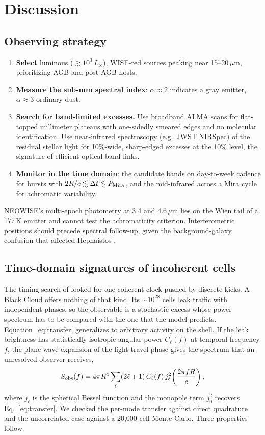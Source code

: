 \documentclass[final,5p]{elsarticle}
\newcommand{\Lsun}{L_\odot}
\begin{document}
\section{Discussion}\label{sec:discussion}

\subsection{Observing strategy}
\begin{enumerate}
\item \textbf{Select} luminous ($\gtrsim10^3\,\Lsun$), WISE-red sources peaking near 15--20\,$\mu$m, prioritizing AGB and post-AGB hosts.
\item \textbf{Measure the sub-mm spectral index}: $\alpha\approx2$ indicates a gray emitter, $\alpha\approx3$ ordinary dust.
\item \textbf{Search for band-limited excesses.} Use broadband ALMA scans for flat-topped millimeter plateaus with one-sidedly smeared edges and no molecular identification. Use near-infrared spectroscopy (e.g.\ JWST NIRSpec) of the residual stellar light for 10\%-wide, sharp-edged excesses at the 10\% level, the signature of efficient optical-band links.
\item \textbf{Monitor in the time domain}: the candidate bands on day-to-week cadence for bursts with $2R/c\lesssim\Delta t\lesssim P_{\rm Mira}$, and the mid-infrared across a Mira cycle for achromatic variability.
\end{enumerate}
NEOWISE's multi-epoch photometry at 3.4 and 4.6\,$\mu$m \citep{Mainzer2014} lies on the Wien tail of a 177\,K emitter and cannot test the achromaticity criterion. Interferometric positions should precede spectral follow-up, given the background-galaxy confusion that affected Hephaistos \citep{Ren2024,Blain2024,Zackrisson2026}.

\subsection{Time-domain signatures of incoherent cells}\label{sec:incoherent}
The timing search of \citet{Guillochon2026} looked for one coherent clock pushed by discrete kicks. A Black Cloud offers nothing of that kind. Its $\sim10^{28}$ cells leak traffic with independent phases, so the observable is a stochastic excess whose power spectrum has to be compared with the one that the model predicts. Equation~\eqref{eq:transfer} generalizes to arbitrary activity on the shell. If the leak brightness has statistically isotropic angular power $C_\ell(f)$ at temporal frequency $f$, the plane-wave expansion of the light-travel phase gives the spectrum that an unresolved observer receives,
\begin{equation}
S_{\rm obs}(f) = 4\pi R^4\sum_\ell (2\ell+1)\,C_\ell(f)\,j_\ell^2\!\left(\frac{2\pi fR}{c}\right),
\label{eq:kernel}
\end{equation}
where $j_\ell$ is the spherical Bessel function and the monopole term $j_0^2$ recovers Eq.~\eqref{eq:transfer}. We checked the per-mode transfer against direct quadrature and the uncorrelated case against a 20{,}000-cell Monte Carlo. Three properties follow.
\end{document}
